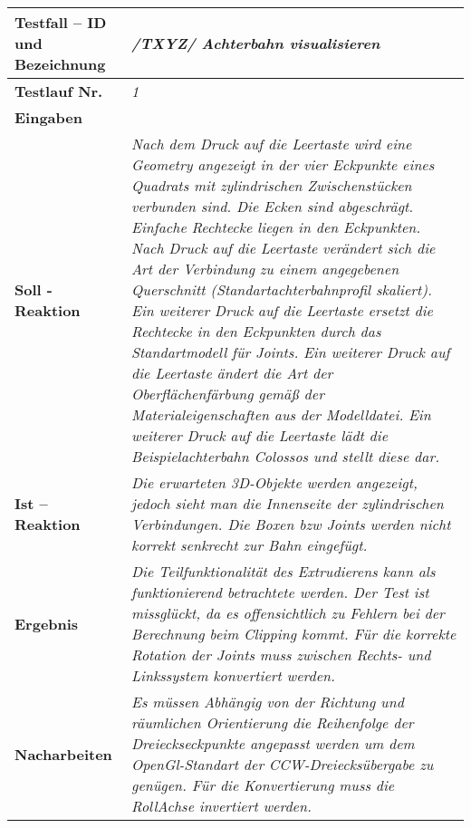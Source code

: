 \begin{longtable}{|p{7cm}|p{10cm}|}
\hline
\textbf{Testfall -- ID und Bezeichnung} & \textit{ /TXYZ/ Achterbahn visualisieren} \\
\hline
\textbf{Testlauf Nr.} & \textit{1} \\
\hline
\textbf{Eingaben} & \textit{} \\
\hline
\textbf{Soll - Reaktion} & \textit{Nach dem Druck auf die Leertaste wird eine Geometry angezeigt in der vier Eckpunkte eines Quadrats mit zylindrischen Zwischenstücken verbunden sind. Die Ecken sind abgeschrägt. Einfache Rechtecke liegen in den Eckpunkten.
Nach Druck auf die Leertaste verändert sich die Art der Verbindung zu einem angegebenen Querschnitt (Standartachterbahnprofil skaliert). Ein weiterer Druck auf die Leertaste ersetzt die Rechtecke in den Eckpunkten durch 
das Standartmodell für Joints. Ein weiterer Druck auf die Leertaste ändert die Art der Oberflächenfärbung gemäß der Materialeigenschaften aus der Modelldatei. Ein weiterer Druck auf die Leertaste lädt die Beispielachterbahn Colossos und stellt diese dar.
} \\
\hline
\textbf{Ist -- Reaktion} & \textit{Die erwarteten 3D-Objekte werden angezeigt, jedoch sieht man die Innenseite der zylindrischen Verbindungen. Die Boxen bzw Joints werden nicht korrekt senkrecht zur Bahn eingefügt.} \\
\hline
\textbf{Ergebnis} & \textit{Die Teilfunktionalität des Extrudierens kann als funktionierend betrachtete werden. Der Test ist missglückt, da es offensichtlich zu Fehlern bei der Berechnung beim Clipping kommt. 
Für die korrekte Rotation der Joints muss zwischen Rechts- und Linkssystem konvertiert werden.} \\
\hline
\textbf{Nacharbeiten } & \textit{Es müssen Abhängig von der Richtung und räumlichen Orientierung die Reihenfolge der Dreieckseckpunkte angepasst werden um dem OpenGl-Standart der CCW-Dreiecksübergabe zu genügen.
Für die Konvertierung muss die RollAchse invertiert werden.} \\
\hline
 \end{longtable}


